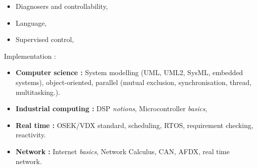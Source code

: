 \documentclass[11pt,a4paper,sans]{moderncv}        %
\newcommand{\myitem}{\textbullet}
\begin{document}
\begin{samepage}
{{\begin{itemize}[label=\myitem]
		\item {\small Diagnosers and controllability,}%
		\item {\small Language,}%
		\item {\small Supervised control,}%
		\end{itemize}}}{Implementation :}%
{{%
		\begin{itemize}[label=\myitem]%
\item \textbf{Computer science : }%
{\small System modelling (UML, UML2, SysML, embedded systems), object-oriented, parallel (mutual exclusion, synchronisation, thread, multitasking.).}%
\item \textbf{Industrial computing : }%
{\small DSP \textit{notions}, Microcontroller \textit{basics}, } %
\item \textbf{Real time : }%
{\small OSEK/VDX standard, scheduling, RTOS, requirement checking, reactivity.}%
\item \textbf{Network : }%
{\small Internet \textit{basics}, Network Calculus, CAN, AFDX, real time network.}%
	\end{itemize}%
}}%
	

\end{samepage}
\end{document}
